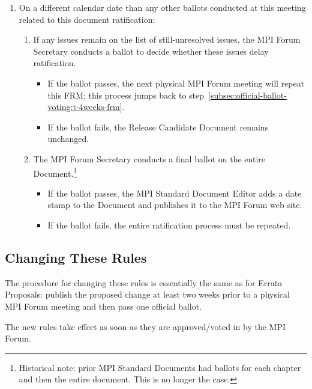 \begin{enumerate}
\begin{enumerate}
  \item On a different calendar date than any other ballots conducted
    at this meeting related to this document ratification:
    \begin{enumerate}
    \item If any issues remain on the list of still-unresolved issues,
      the MPI Forum Secretary conducts a ballot to decide whether
      these issues delay ratification.
      \begin{itemize}
      \item If the ballot passes, the next physical MPI Forum meeting
        will repeat this FRM; this process jumps back to
        step~\ref{subsec:official-ballot-voting:t-4weeks-frm}.
      \item If the ballot fails, the Release Candidate Document
        remains unchanged.
      \end{itemize}
    \item The MPI Forum Secretary conducts a final ballot on the
      entire Document.\footnote{Historical note: prior MPI Standard
        Documents had ballots for each chapter and then the entire
        document.  This is no longer the case.}
      \begin{itemize}
      \item If the ballot passes, the MPI Standard Document Editor adds
        a date stamp to the Document and publishes it to the MPI Forum
        web site.
      \item If the ballot fails, the entire ratification process must be
        repeated.
      \end{itemize}
    \end{enumerate}
  \end{enumerate}
\end{enumerate}


\subsection{Changing These Rules}

The procedure for changing these rules is essentially the same as for
Errata Proposals: publish the proposed change at least two weeks prior
to a physical MPI Forum meeting and then pass one official ballot.

The new rules take effect as soon as they are approved/voted in by the
MPI Forum.

